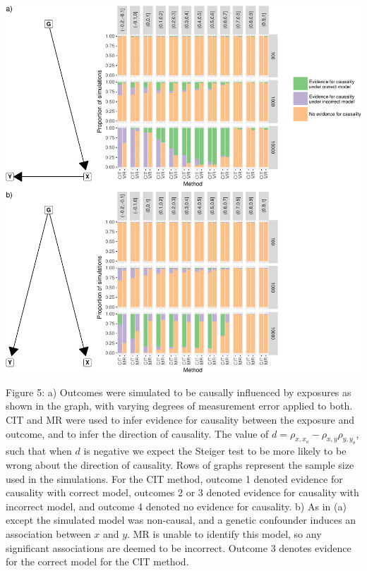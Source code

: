 \documentclass[]{article}
\begin{document}
\newpage

\includegraphics{manuscript_files/figure-latex/cit_mr_comparison_figure-1.pdf}

Figure 5: a) Outcomes were simulated to be causally influenced by
exposures as shown in the graph, with varying degrees of measurement
error applied to both. CIT and MR were used to infer evidence for
causality between the exposure and outcome, and to infer the direction
of causality. The value of
\(d = \rho_{x, x_o} - \rho_{x,y}\rho_{y,y_o}\), such that when \(d\) is
negative we expect the Steiger test to be more likely to be wrong about
the direction of causality. Rows of graphs represent the sample size
used in the simulations. For the CIT method, outcome 1 denoted evidence
for causality with correct model, outcomes 2 or 3 denoted evidence for
causality with incorrect model, and outcome 4 denoted no evidence for
causality. b) As in (a) except the simulated model was non-causal, and a
genetic confounder induces an association between \(x\) and \(y\). MR is
unable to identify this model, so any significant associations are
deemed to be incorrect. Outcome 3 denotes evidence for the correct model
for the CIT method.

\newpage
\end{document}
